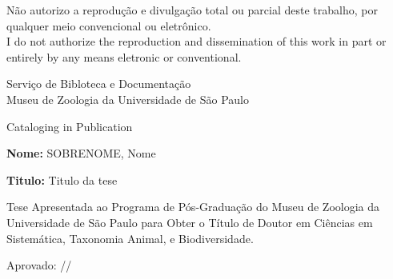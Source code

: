 \documentclass[12pt,twoside,a4paper]{book}
\begin{document}
\newpage
\thispagestyle{empty}
    \begin{center}
    \normalsize{Não autorizo a reprodução e divulgação total ou parcial deste trabalho, por qualquer meio convencional ou eletrônico.\\

    \vspace{0.5cm}
    I do not authorize the reproduction and dissemination of this work in part or entirely by any means eletronic or conventional.}
    
    \vskip 7cm

    \normalsize{Serviço de Bibloteca e Documentação\\
    Museu de Zoologia da Universidade de São Paulo\\
    
    \vspace{1cm}

    Cataloging in Publication}

    \vskip 1cm

    \end{center}

\newpage
\thispagestyle{empty}
    \noindent \textbf{Nome:} SOBRENOME, Nome \\
    \vspace{0.2cm}

    \noindent \textbf{Titulo:} Titulo da tese \\
    \vspace{0.2cm}

    \noindent Tese Apresentada ao Programa de Pós-Graduação do Museu de Zoologia da Universidade de São Paulo para Obter o Título de Doutor em Ciências em Sistemática, Taxonomia Animal, e Biodiversidade.
    \vspace{0.7cm}

    \noindent Aprovado: \underline{\hspace{1cm}}/\underline{\hspace{1cm}}/\underline{\hspace{2cm}}

    \vskip 3cm
\end{document}

